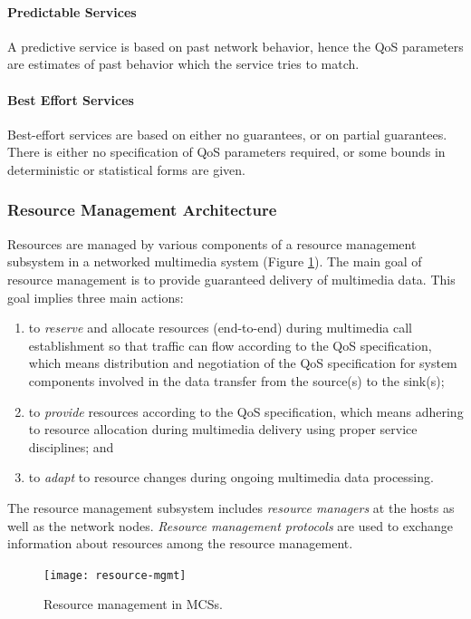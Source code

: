 \paragraph*{Predictable Services}
A predictive service is based on past network behavior, hence the QoS parameters are estimates of past behavior which the service tries to match.

\paragraph*{Best Effort Services}
Best-effort services are based on either no guarantees, or on partial guarantees. There is either no specification of QoS parameters required, or some bounds in deterministic or statistical forms are given.

\subsubsection[Resource Management]{Resource Management Architecture}
Resources are managed by various components of a resource management subsystem in a networked multimedia system (Figure \ref{fig:resource-mgmt}). The main goal of resource management is to provide guaranteed delivery of multimedia data. This goal implies three main actions: 
\begin{enumerate}
	\item to \textit{reserve} and allocate resources (end-to-end) during multimedia call establishment so that traffic can flow according to the QoS specification, which means distribution and negotiation of the QoS specification for system components involved in the data transfer from the source(s) to the sink(s);
	
	\item to \textit{provide} resources according to the QoS specification, which means adhering to resource allocation during multimedia delivery using proper service disciplines; and
	
	\item to \textit{adapt} to resource changes during ongoing multimedia data processing.
\end{enumerate}
The resource management subsystem includes \textit{resource managers} at the hosts as well as the network nodes. \textit{Resource management protocols} are used to exchange information about resources among the resource management. 


\begin{figure}[pht]
	\centering
	\texttt{[image: resource-mgmt]}
	\caption{Resource management in MCSs.}\label{fig:resource-mgmt}
\end{figure}


